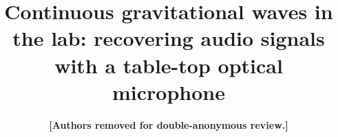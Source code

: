 \documentclass[aps,pra,superscriptaddress,reprint]{revtex4-1}
\begin{document}
\title{Continuous gravitational waves in the lab: recovering audio signals with a table-top optical microphone}

\author{\textbf{[Authors removed for double-anonymous review.]}}

\begin{comment}

\author{James W. Gardner}
\email{u6069809@anu.edu.au}
\affiliation{%
ANU Centre for Gravitational Astrophysics, The Australian National University, Acton, ACT, 2601, Australia
}
\affiliation{%
OzGrav-ANU, Australian Research Council Centre of Excellence for Gravitational Wave Discovery, The Australian National University, Acton, ACT, 2601, Australia
} 
\affiliation{%
School of Physics, University of Melbourne, Parkville, Victoria, 3010, Australia
}


\author{Hannah Middleton}
\email{hannah.middleton@unimelb.edu.au}
\affiliation{%
School of Physics, University of Melbourne, Parkville, Victoria, 3010, Australia
}
\affiliation{%
Centre for Astrophysics and Supercomputing, Swinburne University of Technology, Hawthorn, Victoria 3122, Australia 
}
\affiliation{%
OzGrav-Melbourne, Australian Research Council Centre of Excellence for Gravitational Wave Discovery, Parkville, Victoria 3010, Australia
}

\author{Changrong Liu}
\affiliation{%
Department of Electrical and Electronic Engineering, University of Melbourne, Parkville, Victoria 3010, Australia
}
\affiliation{%
OzGrav-Melbourne, Australian Research Council Centre of Excellence for Gravitational Wave Discovery, Parkville, Victoria 3010, Australia
}

\author{Andrew Melatos}
\email{amelatos@unimelb.edu.au}
\affiliation{%
School of Physics, University of Melbourne, Parkville, Victoria, 3010, Australia
}
\affiliation{%
OzGrav-Melbourne, Australian Research Council Centre of Excellence for Gravitational Wave Discovery, Parkville, Victoria 3010, Australia
}


\author{Robin Evans}
\affiliation{%
Department of Electrical and Electronic Engineering, University of Melbourne, Parkville, Victoria 3010, Australia
}
\affiliation{%
OzGrav-Melbourne, Australian Research Council Centre of Excellence for Gravitational Wave Discovery, Parkville, Victoria 3010, Australia
}

\author{William Moran}
\affiliation{%
Department of Electrical and Electronic Engineering, University of Melbourne, Parkville, Victoria 3010, Australia
}



\end{comment}
\end{document}
